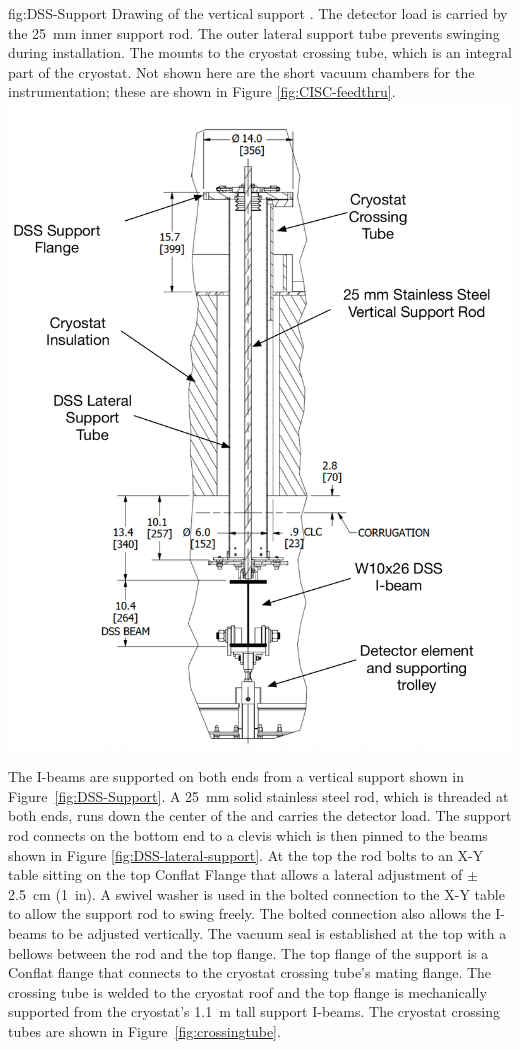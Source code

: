\begin{dunefigure}{fig:DSS-Support}
  { Drawing of the  vertical support \fdth. The detector load is carried by the \SI{25}{mm} inner support rod. The outer lateral support tube prevents swinging during installation.  The \fdth mounts to the cryostat crossing tube, which is an integral part of the cryostat. Not shown here are the short vacuum chambers for the  instrumentation; these are shown in Figure \ref{fig:CISC-feedthru}.}
\includegraphics[width=.85\textwidth]{graphics/DSS-Support.pdf}
\end{dunefigure}


The  I-beams are supported on both ends from a vertical support \fdth shown in Figure~\ref{fig:DSS-Support}. A \SI{25}{mm} solid stainless steel rod, which is threaded at both ends, runs down the center of the \fdth and carries the detector load. The support rod connects on the bottom end to a clevis which is then pinned to the  beams shown in Figure \ref{fig:DSS-lateral-support}. At the top the rod bolts to an X-Y table sitting on the top Conflat Flange that allows a lateral adjustment of $\pm$\SI{2.5}{cm} (\SI{1}{in}). A swivel washer is used in the bolted connection to the X-Y table to allow the support rod to swing freely. The bolted connection also allows the  I-beams to be adjusted vertically. The vacuum seal is established at the top with a bellows between the rod and the top flange. The top flange of the  support \fdth is a Conflat flange that connects to the cryostat crossing tube's mating flange. The crossing  tube is welded to the cryostat roof and the top flange is mechanically supported from the cryostat's  \SI{1.1}{m} tall support I-beams. The cryostat crossing tubes are shown in Figure~\ref{fig:crossingtube}.

